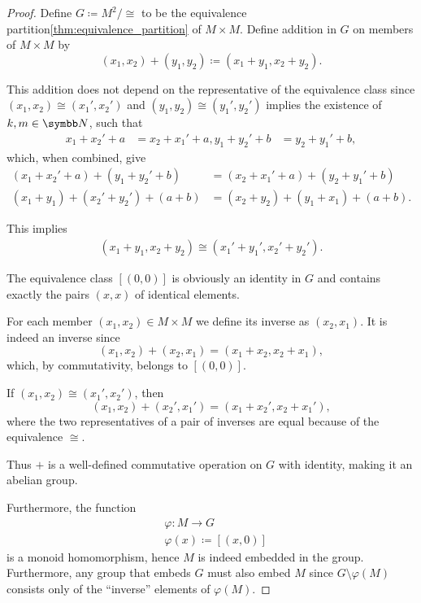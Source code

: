 \begin{proof}
  Define \( G \coloneqq M^2 / \cong \) to be the equivalence partition\cref{thm:equivalence_partition} of \( M \times M \). Define addition in \( G \) on members of \( M \times M \) by
  \begin{equation*}
    (x_1, x_2) + (y_1, y_2)
    \coloneqq
    (x_1 + y_1, x_2 + y_2).
  \end{equation*}

  This addition does not depend on the representative of the equivalence class since \( (x_1, x_2) \cong (x_1', x_2') \) and \( (y_1, y_2) \cong (y_1', y_2') \) implies the existence of \( k, m \in \BB{N} \), such that
  \begin{align*}
    x_1 + x_2' + a &= x_2 + x_1' + a,
    y_1 + y_2' + b &= y_2 + y_1' + b,
  \end{align*}
  which, when combined, give
  \begin{align*}
    (x_1 + x_2' + a) + (y_1 + y_2' + b)
    &=
    (x_2 + x_1' + a) + (y_2 + y_1' + b)
    \\
    (x_1 + y_1) + (x_2' + y_2') + (a + b)
    &=
    (x_2 + y_2) + (y_1 + x_1) + (a + b).
  \end{align*}

  This implies
  \begin{align*}
    (x_1 + y_1, x_2 + y_2)
    \cong
    (x_1' + y_1', x_2' + y_2').
  \end{align*}

  The equivalence class \( [(0, 0)] \) is obviously an identity in \( G \) and contains exactly the pairs \( (x, x) \) of identical elements.

  For each member \( (x_1, x_2) \in M \times M \) we define its inverse as \( (x_2, x_1) \). It is indeed an inverse since
  \begin{equation*}
    (x_1, x_2) + (x_2, x_1) = (x_1 + x_2, x_2 + x_1),
  \end{equation*}
  which, by commutativity, belongs to \( [(0, 0)] \).

  If \( (x_1, x_2) \cong (x_1', x_2') \), then
  \begin{equation*}
    (x_1, x_2) + (x_2', x_1')
    =
    (x_1 + x_2', x_2 + x_1'),
  \end{equation*}
  where the two representatives of a pair of inverses are equal because of the equivalence \( \cong \).

  Thus \( + \) is a well-defined commutative operation on \( G \) with identity, making it an abelian group.

  Furthermore, the function
  \begin{align*}
    &\varphi: M \to G \\
    &\varphi(x) \coloneqq [(x, 0)]
  \end{align*}
  is a monoid homomorphism, hence \( M \) is indeed embedded in the group. Furthermore, any group that embeds \( G \) must also embed \( M \) since \( G \setminus \varphi(M) \) consists only of the \enquote{inverse} elements of \( \varphi(M) \).
\end{proof}


